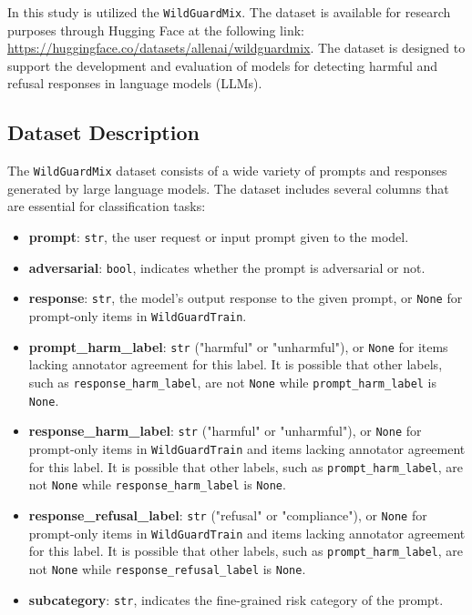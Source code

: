 \documentclass{article}
\begin{document}
In this study is utilized the \texttt{WildGuardMix}. The dataset is available for research purposes through Hugging Face at the following link: \href{https://huggingface.co/datasets/allenai/wildguardmix}{https://huggingface.co/datasets/allenai/wildguardmix}. The dataset is designed to support the development and evaluation of models for detecting harmful and refusal responses in language models (LLMs).

\subsection{Dataset Description}

The \texttt{WildGuardMix} dataset consists of a wide variety of prompts and responses generated by large language models. The dataset includes several columns that are essential for classification tasks:
\begin{itemize}
    \item \textbf{prompt}: \texttt{str}, the user request or input prompt given to the model.
    \item \textbf{adversarial}: \texttt{bool}, indicates whether the prompt is adversarial or not.
    \item \textbf{response}: \texttt{str}, the model's output response to the given prompt, or \texttt{None} for prompt-only items in \texttt{WildGuardTrain}.
    \item \textbf{prompt\_harm\_label}: \texttt{str} ("harmful" or "unharmful"), or \texttt{None} for items lacking annotator agreement for this label. It is possible that other labels, such as \texttt{response\_harm\_label}, are not \texttt{None} while \texttt{prompt\_harm\_label} is \texttt{None}.
    \item \textbf{response\_harm\_label}: \texttt{str} ("harmful" or "unharmful"), or \texttt{None} for prompt-only items in \texttt{WildGuardTrain} and items lacking annotator agreement for this label. It is possible that other labels, such as \texttt{prompt\_harm\_label}, are not \texttt{None} while \texttt{response\_harm\_label} is \texttt{None}.
    \item \textbf{response\_refusal\_label}: \texttt{str} ("refusal" or "compliance"), or \texttt{None} for prompt-only items in \texttt{WildGuardTrain} and items lacking annotator agreement for this label. It is possible that other labels, such as \texttt{prompt\_harm\_label}, are not \texttt{None} while \texttt{response\_refusal\_label} is \texttt{None}.
    \item \textbf{subcategory}: \texttt{str}, indicates the fine-grained risk category of the prompt.
\end{itemize}
\end{document}
